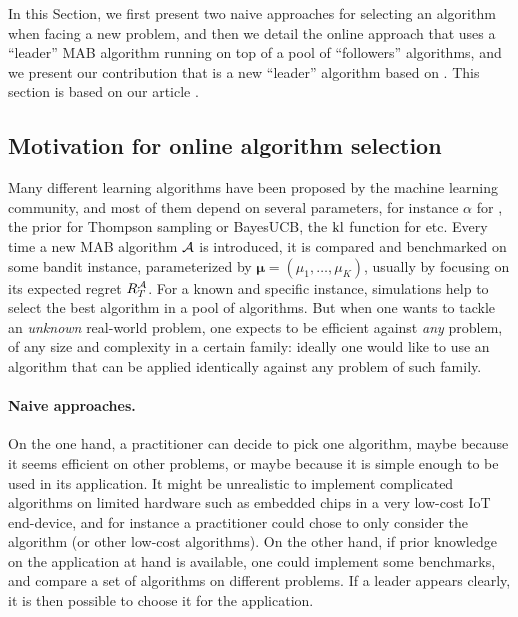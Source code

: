 In this Section, we first present two naive approaches for selecting an algorithm when facing a new problem, and then we detail the online approach that uses a ``leader'' MAB algorithm running on top of a pool of ``followers'' algorithms, and we present our contribution that is a new ``leader'' algorithm based on \ExpQ.
This section is based on our article \cite{Besson2018WCNC}.


\subsection{Motivation for online algorithm selection}\label{sub:25:introduction}

Many different learning algorithms have been proposed by the machine learning community,
and most of them depend on several parameters, for instance $\alpha$ for \UCB, the prior for Thompson sampling or BayesUCB,
the $\mathrm{kl}$ function for \klUCB{} etc.
Every time a new MAB algorithm $\mathcal{A}$ is introduced, it is compared and benchmarked on some bandit instance, parameterized by $\boldsymbol{\mu} = (\mu_1,\dots,\mu_K)$, usually by focusing on its expected regret $R_T^{\mathcal{A}}$.
%
For a known and specific instance, simulations help to select the best algorithm in a pool of algorithms.
But when one wants to tackle an \emph{unknown} real-world problem, one expects to be efficient against \emph{any} problem, of any size and complexity in a certain family:
ideally one would like to use an algorithm that can be applied identically against any problem of such family.


\paragraph{Naive approaches.}
%
On the one hand, a practitioner can decide to pick one algorithm, maybe because it seems efficient on other problems, or maybe because it is simple enough to be used in its application. It might be unrealistic to implement complicated algorithms on limited hardware such as embedded chips in a very low-cost IoT end-device, and for instance a practitioner could chose to only consider the \UCB{} algorithm (or other low-cost algorithms).
%
On the other hand, if prior knowledge on the application at hand is available, one could implement some benchmarks, and compare a set of algorithms on different problems. If a leader appears clearly, it is then possible to choose it for the application.


